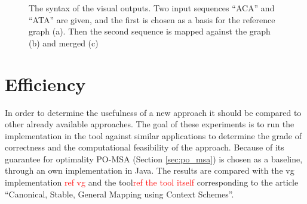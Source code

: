 \documentclass[thesis.tex]{subfiles}
\begin{document}
\begin{figure}[b]
\begin{mdframed}
\begin{subfigure}[b]{0.32\textwidth}
\begin{mdframed}
\begin{center}
        \end{center}
      \end{mdframed}
      \caption{}
    \end{subfigure}
    \begin{subfigure}[b]{0.32\textwidth}
      \begin{mdframed}
        \begin{center}
        \end{center}
      \end{mdframed}
      \caption{}
    \end{subfigure}
  \end{mdframed}
  \caption{The syntax of the visual outputs. Two input sequences ``ACA'' and ``ATA'' are given, and the first is chosen as a basis for the reference graph (a). Then the second sequence is mapped against the graph (b) and merged (c)}
  \label{fig:visual_output}
\end{figure}
\clearpage
\section{Efficiency}
In order to determine the usefulness of a new approach it should be compared to other already available approaches. The goal of these experiments is to run the implementation in the tool against similar applications to determine the grade of correctness and the computational feasibility of the approach. Because of its guarantee for optimality PO-MSA (Section \ref{sec:po_msa}) is chosen as a baseline, through an own implementation in Java. The results are compared with the vg implementation \textcolor{red}{ref vg} and the tool\textcolor{red}{ref the tool itself} corresponding to the article ``Canonical, Stable, General Mapping using Context Schemes''\cite{canonical_stable_general_mapping_using_context_schemes}.
\end{document}
